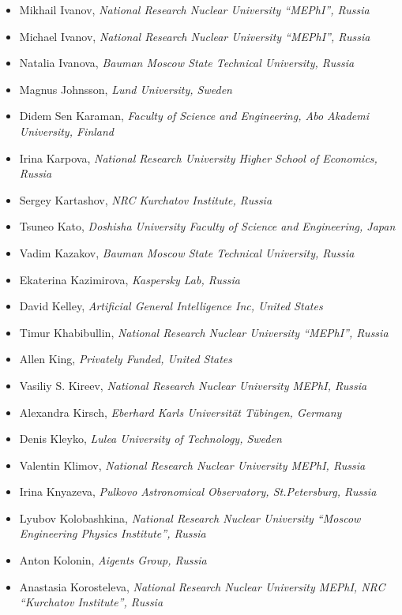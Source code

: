 \documentclass[10pt,fleqn,openany]{book} %
\begin{document}
\begin{itemize}
		\item Mikhail Ivanov, \textit{National Research Nuclear University ``MEPhI'', Russia}
		\item Michael Ivanov, \textit{National Research Nuclear University ``MEPhI'', Russia}
		\item Natalia Ivanova, \textit{Bauman Moscow State Technical University, Russia}
		\item Magnus Johnsson, \textit{Lund University, Sweden}
		\item Didem Sen Karaman, \textit{Faculty of Science and Engineering, Abo Akademi University, Finland}
		\item Irina Karpova, \textit{National Research University Higher School of Economics, Russia}
		\item Sergey Kartashov, \textit{NRC Kurchatov Institute, Russia}
		\item Tsuneo Kato, \textit{Doshisha University Faculty of Science and Engineering, Japan}
		\item Vadim Kazakov, \textit{Bauman Moscow State Technical University, Russia}
		\item Ekaterina Kazimirova, \textit{Kaspersky Lab, Russia}
		\item David Kelley, \textit{Artificial General Intelligence Inc, United States}
		\item Timur Khabibullin, \textit{National Research Nuclear University ``MEPhI'', Russia}
		\item Allen King, \textit{Privately Funded, United States}
		\item Vasiliy S. Kireev, \textit{National Research Nuclear University MEPhI, Russia}
		\item Alexandra Kirsch, \textit{Eberhard Karls Universität Tübingen, Germany}
		\item Denis Kleyko, \textit{Lulea University of Technology, Sweden}
		\item Valentin Klimov, \textit{National Research Nuclear University MEPhI, Russia}
		\item Irina Knyazeva, \textit{Pulkovo Astronomical Observatory, St.Petersburg, Russia}
		\item Lyubov Kolobashkina, \textit{National Research Nuclear University ``Moscow Engineering Physics Institute'', Russia}
		\item Anton Kolonin, \textit{Aigents Group, Russia}
		\item Anastasia Korosteleva, \textit{National Research Nuclear University MEPhI, NRC ``Kurchatov Institute'', Russia}

\end{itemize}
\end{document}
